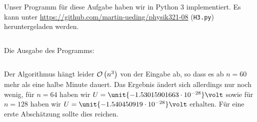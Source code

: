 \documentclass[11pt, ngerman, fleqn]{article}
\newcommand{\e}[1]{\cdot 10^{#1}}
\begin{document}
Unser Programm für diese Aufgabe haben wir in Python 3 implementiert. Es kann
unter \url{https://github.com/martin-ueding/physik321-08} (\texttt{H3.py})
heruntergeladen werden.

\inputminted[fontsize=\small, frame=lines, linenos, mathescape]{python}{H3.py}

Die Ausgabe des Programms:

\inputminted[fontsize=\small, frame=lines]{text}{H3.txt}

Der Algorithmus hängt leider $\mathcal O\del{n^3}$ von der Eingabe ab, so dass
es ab $n = 60$ mehr als eine halbe Minute dauert. Das Ergebnis ändert sich
allerdings nur noch wenig, für $n = 64$ haben wir $U =
\unit{-1.53015901663\e{-28}}\volt$ sowie für $n = 128$ haben wir $U =
\unit{-1.540450919\e{-28}}\volt$ erhalten. Für eine erste Abschätzung sollte
dies reichen.
\end{document}
